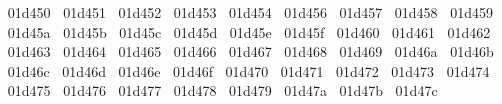 {  ^^^^^^01d450%
  ^^^^^^01d451%
  ^^^^^^01d452%
  ^^^^^^01d453%
  ^^^^^^01d454%
  ^^^^^^01d456%
  ^^^^^^01d457%
  ^^^^^^01d458%
  ^^^^^^01d459%
  ^^^^^^01d45a%
  ^^^^^^01d45b%
  ^^^^^^01d45c%
  ^^^^^^01d45d%
  ^^^^^^01d45e%
  ^^^^^^01d45f%
  ^^^^^^01d460%
  ^^^^^^01d461%
  ^^^^^^01d462%
  ^^^^^^01d463%
  ^^^^^^01d464%
  ^^^^^^01d465%
  ^^^^^^01d466%
  ^^^^^^01d467%
  ^^^^^^01d468%
  ^^^^^^01d469%
  ^^^^^^01d46a%
  ^^^^^^01d46b%
  ^^^^^^01d46c%
  ^^^^^^01d46d%
  ^^^^^^01d46e%
  ^^^^^^01d46f%
  ^^^^^^01d470%
  ^^^^^^01d471%
  ^^^^^^01d472%
  ^^^^^^01d473%
  ^^^^^^01d474%
  ^^^^^^01d475%
  ^^^^^^01d476%
  ^^^^^^01d477%
  ^^^^^^01d478%
  ^^^^^^01d479%
  ^^^^^^01d47a%
  ^^^^^^01d47b%
  ^^^^^^01d47c%
}

